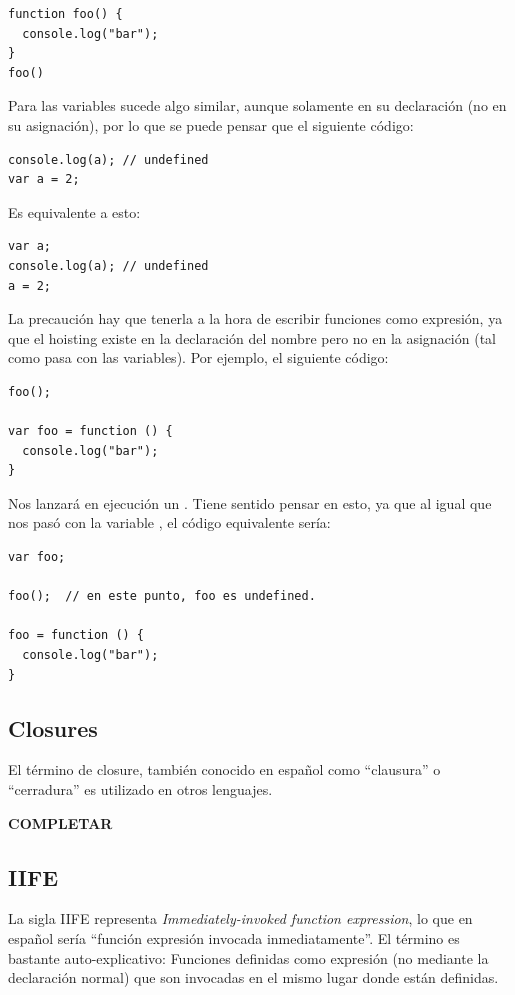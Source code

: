 \begin{lstlisting}
function foo() {
  console.log("bar");
}
foo()
\end{lstlisting}

Para las variables sucede algo similar, aunque solamente en su declaración (no en su asignación), por lo que se puede pensar que el siguiente código:

\begin{lstlisting}
console.log(a); // undefined
var a = 2;
\end{lstlisting}

Es equivalente a esto:

\begin{lstlisting}
var a;
console.log(a);	// undefined
a = 2;
\end{lstlisting}

La precaución hay que tenerla a la hora de escribir funciones como expresión, ya que el hoisting existe en la declaración del nombre pero no en la asignación (tal como pasa con las variables). Por ejemplo, el siguiente código:

\begin{lstlisting}
foo();

var foo = function () { 
  console.log("bar");
}
\end{lstlisting}

Nos lanzará en ejecución un . Tiene sentido pensar en esto, ya que al igual que nos pasó con la variable , el código equivalente sería:

\begin{lstlisting}
var foo;

foo();	// en este punto, foo es undefined.

foo = function () { 
  console.log("bar");
}
\end{lstlisting}

\subsection{Closures}

El término de closure, también conocido en español como "`clausura"' o "`cerradura"' es utilizado en otros lenguajes.

\textbf{COMPLETAR}

\subsection{IIFE}

La sigla IIFE representa \textit{Immediately-invoked function expression}, lo que en español sería "`función expresión invocada inmediatamente"'. El término es bastante auto-explicativo: Funciones definidas como expresión (no mediante la declaración normal) que son invocadas en el mismo lugar donde están definidas.

